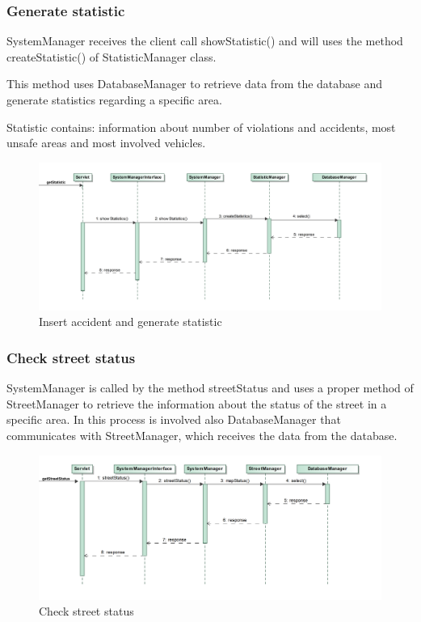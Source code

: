 \newpage

\subsubsection{Generate statistic}
SystemManager receives the client call showStatistic() and will uses the method createStatistic() of StatisticManager class.

This method uses DatabaseManager to retrieve data from the database and generate statistics regarding a specific area.

Statistic contains: information about number of violations and accidents, most unsafe areas and most involved vehicles.
\begin{figure}[H]
	\centering
	\includegraphics[width=0.97\linewidth, height=0.35\textheight]{Images/RunTimeDiagram/Sequence4}
	\caption{Insert accident and generate statistic}
	\label{fig:Insert accident and generate statistic}
\end{figure}

\newpage

\subsubsection{Check street status}
SystemManager is called by the method streetStatus and uses a proper method of StreetManager to retrieve the information about the status of the street in a specific area. In this process is involved also DatabaseManager that communicates with StreetManager, which receives the data from the database.
\begin{figure}[H]
	\centering
	\includegraphics[width=0.95\linewidth, height=0.35\textheight]{Images/RunTimeDiagram/Sequence5}
	\caption{Check street status}
	\label{fig:Check street status}
\end{figure}

